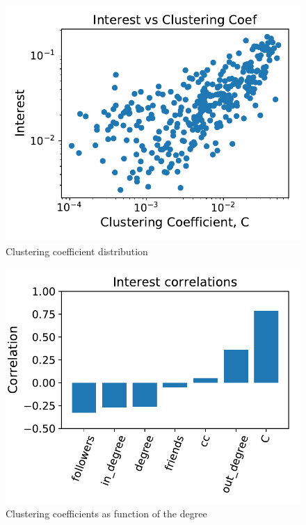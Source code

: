 \documentclass[11pt, twoside]{report}
\begin{document}
\begin{minipage}[b]{0.5\textwidth}
   \centering
    \begin{figure}[H]
      \includegraphics[width=\textwidth]{../../scripts/network_analysis/imgs/hubs_interest_corr.pdf}            
          \caption{Clustering coefficient distribution}
      \label{fig:path_time}
\end{figure}
\end{minipage}
\begin{minipage}[b]{0.5\textwidth}
  \begin{figure}[H]
  \centering
      \includegraphics[width=\textwidth]{../../scripts/network_analysis/imgs/hubs_interest_corr_hist.pdf}            
      \caption{Clustering coefficients as function of the degree}
\end{figure}
\end{minipage}
\end{document}
